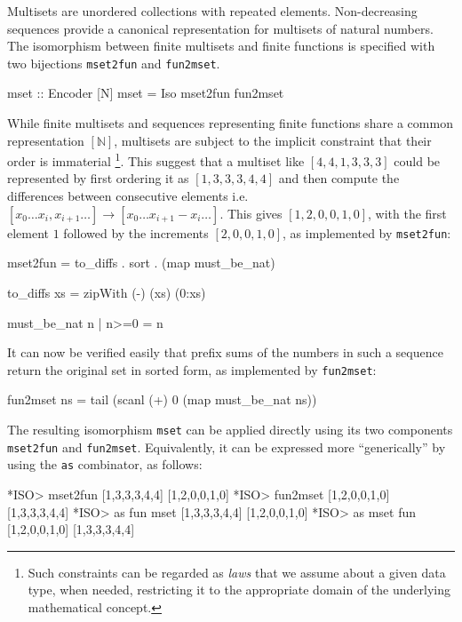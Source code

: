 \documentclass[]{INCLUDES/llncs}
\begin{document}
Multisets \cite{multisetOver} are unordered collections with repeated
elements. Non-decreasing sequences provide a canonical representation for
multisets of natural numbers. 
The isomorphism between finite multisets and finite functions is specified with
two bijections {\tt mset2fun} and {\tt fun2mset}.
\begin{code}
mset :: Encoder [N]
mset = Iso mset2fun fun2mset
\end{code}
While finite multisets and sequences representing finite functions share a
common representation $[\mathbb{N}]$, multisets are subject to the implicit constraint that their
order is immaterial \footnote{Such
constraints can be regarded as {\em laws} that we assume about 
a given data type, when needed, restricting it to the
appropriate domain of the underlying mathematical concept.}.
This suggest that a multiset like $[4,4,1,3,3,3]$ could be
represented by first ordering it as $[1,3,3,3,4,4]$ and then compute the 
differences between consecutive elements i.e.
$[x_0 \ldots x_i, x_{i+1} \ldots] \rightarrow [x_0 \ldots x_{i+1}-x_i
\ldots]$.
This gives $[1,2,0,0,1,0]$, with
the first element $1$ followed by the increments $[2,0,0,1,0]$,
as implemented by {\tt mset2fun}:
\begin{code}
mset2fun = to_diffs . sort . (map must_be_nat)

to_diffs xs = zipWith (-) (xs) (0:xs)

must_be_nat n | n>=0 = n
\end{code}
It can now be verified easily that prefix sums of the
numbers in such a sequence
return the original set
in sorted form, as implemented by {\tt fun2mset}:
\begin{code}
fun2mset ns = tail (scanl (+) 0 (map must_be_nat ns)) 
\end{code}
The resulting isomorphism {\tt mset} can be applied directly using its two
components {\tt mset2fun} and {\tt fun2mset}. Equivalently, it can be
expressed more ``generically'' by using the {\tt as} combinator, as
follows:
\begin{codex}
*ISO> mset2fun [1,3,3,3,4,4]
[1,2,0,0,1,0]
*ISO> fun2mset [1,2,0,0,1,0]
[1,3,3,3,4,4]
*ISO> as fun mset [1,3,3,3,4,4]
[1,2,0,0,1,0]
*ISO> as mset fun [1,2,0,0,1,0]
[1,3,3,3,4,4]
\end{codex}
\end{document}
